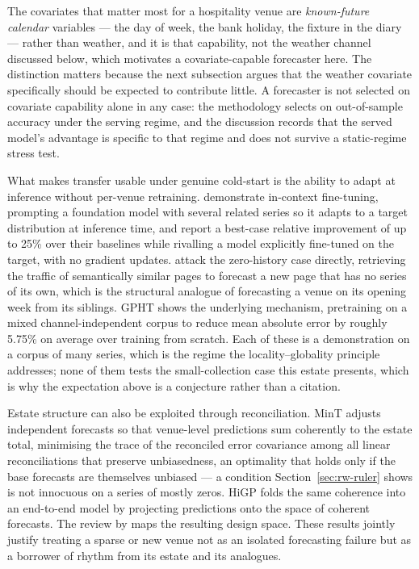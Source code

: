 The covariates that matter most for a hospitality venue are \emph{known-future
calendar} variables --- the day of week, the bank holiday, the fixture in the
diary --- rather than weather, and it is that capability, not the weather
channel discussed below, which motivates a covariate-capable forecaster here.
The distinction matters because the next subsection argues that the weather
covariate specifically should be expected to contribute little. A forecaster is
not selected on covariate capability alone in any case: the methodology
selects on out-of-sample accuracy under the serving regime, and the discussion
records that the served model's advantage is specific to that regime and does
not survive a static-regime stress test.

What makes transfer usable under genuine cold-start is the ability to adapt at
inference without per-venue retraining. \citet{das_-context_2025} demonstrate
in-context fine-tuning, prompting a foundation model with several related
series so it adapts to a target distribution at inference time, and report a
best-case relative improvement of up to 25\% over their baselines while
rivalling a model explicitly fine-tuned on the target, with no gradient
updates. \citet{zhou_context-driven_2025} attack the zero-history case
directly, retrieving the traffic of semantically similar pages to forecast a
new page that has no series of its own, which is the structural analogue of
forecasting a venue on its opening week from its siblings. GPHT
\citep{liu_generative_2024} shows the underlying mechanism, pretraining on a
mixed channel-independent corpus to reduce mean absolute error by roughly
5.75\% on average over training from scratch. Each of these is a demonstration
on a corpus of many series, which is the regime the locality--globality
principle addresses; none of them tests the small-collection case this estate
presents, which is why the expectation above is a conjecture rather than a
citation.

Estate structure can also be exploited through reconciliation. MinT
\citep{wickramasuriya_optimal_2019} adjusts independent forecasts so that
venue-level predictions sum coherently to the estate total, minimising the
trace of the reconciled error covariance among all linear reconciliations that
preserve unbiasedness, an optimality that holds only if the base forecasts are
themselves unbiased --- a condition Section~\ref{sec:rw-ruler} shows is not
innocuous on a series of mostly zeros. HiGP \citep{cini_graph-based_2024} folds
the same coherence into an end-to-end model by projecting predictions onto the
space of coherent forecasts. The review by
\citet{athanasopoulos_forecast_2024} maps the resulting design space. These
results jointly justify treating a sparse or new venue not as an isolated
forecasting failure but as a borrower of rhythm from its estate and its
analogues.

